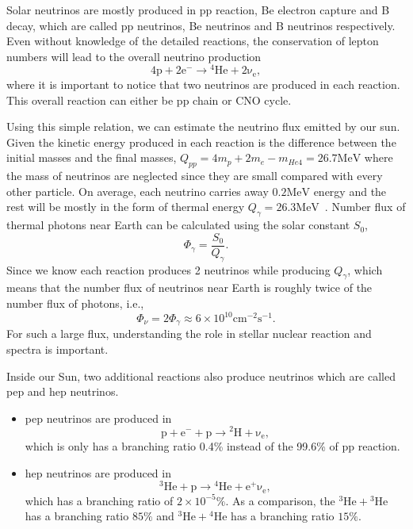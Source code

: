

Solar neutrinos are mostly produced in pp reaction, Be electron capture and B decay, which are called pp neutrinos, Be neutrinos and B neutrinos respectively. Even without knowledge of the detailed reactions, the conservation of lepton numbers will lead to the overall neutrino production
\begin{equation}
\mathrm{4p+2e^- \to {}^4He + 2\nu_e },
\end{equation}
where it is important to notice that two neutrinos are produced in each reaction. This overall reaction can either be pp chain or CNO cycle.

Using this simple relation, we can estimate the neutrino flux emitted by our sun. Given the kinetic energy produced in each reaction is the difference between the initial masses and the final masses, $Q_{pp}=4m_p+2m_e-m_{He4}=26.7\mathrm{MeV}$ where the mass of neutrinos are neglected since they are small compared with every other particle. On average, each neutrino carries away $0.2\mathrm{MeV}$ energy and the rest will be mostly in the form of thermal energy $Q_\gamma=26.3\mathrm{MeV}$~\cite{Adelberger2011a}. Number flux of thermal photons near Earth can be calculated using the solar constant $S_0$,
\begin{equation}
\Phi_\gamma = \frac{S_0}{Q_\gamma}.
\end{equation}
Since we know each reaction produces 2 neutrinos while producing $Q_\gamma$, which means that the number flux of neutrinos near Earth is roughly twice of the number flux of photons, i.e.,
\begin{equation}
\Phi_\nu = 2 \Phi_\gamma \approx 6\times 10^{10} \mathrm{cm^{-2}s^{-1}}.
\end{equation}
For such a large flux, understanding the role in stellar nuclear reaction and spectra is important.

Inside our Sun, two additional reactions also produce neutrinos which are called pep and hep neutrinos.
\begin{itemize}
\item pep neutrinos are produced in 
\begin{equation}
\mathrm{p + e^- + p \to {}^2H +\nu_e},
\end{equation}
which is only has a branching ratio 0.4\% instead of the 99.6\% of pp reaction.
\item hep neutrinos are produced in
\begin{equation}
\mathrm{ {}^3He + p \to {}^4He + e^+ \nu_e },
\end{equation}
which has a branching ratio of $2\times 10^{-5}\%$. As a comparison, the $\mathrm{{}^3He + {}^3He}$ has a branching ratio $85\%$ and $\mathrm{{}^3He + {}^4He}$ has a branching ratio $15\%$.
\end{itemize}



